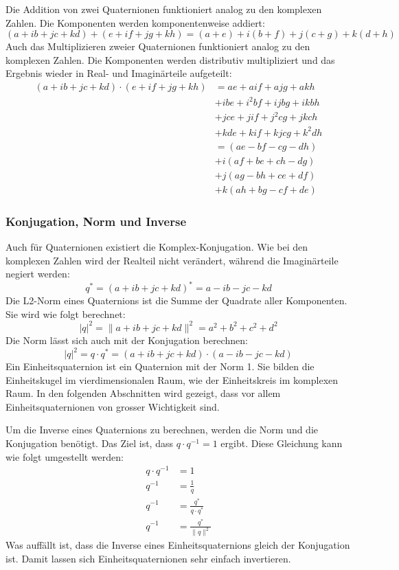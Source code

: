 Die Addition von zwei Quaternionen funktioniert analog zu den 
komplexen Zahlen. Die Komponenten werden komponentenweise addiert:
\begin{equation*}
    (a + ib + jc + kd) + (e + if + jg + kh) 
    = (a+e) + i(b+f) + j(c+g) + k(d+h)
\end{equation*}
Auch das Multiplizieren zweier Quaternionen funktioniert analog zu 
den komplexen Zahlen. Die Komponenten werden distributiv 
multipliziert und das Ergebnis wieder in Real- und Imaginärteile 
aufgeteilt:
\begin{align*}
    (a + ib + jc + kd) \cdot (e + if + jg + kh) 
    &= ae + aif + ajg + akh \\
    &+ ibe + i^2bf + ijbg + ikbh \\
    &+ jce + jif + j^2cg + jkch \\
    &+ kde + kif + kjcg + k^2dh \\
    &= (ae - bf - cg - dh) \\
    &+ i(af + be + ch - dg) \\
    &+ j(ag - bh + ce + df) \\
    &+ k(ah + bg - cf + de)
\end{align*}

\subsubsection{Konjugation, Norm und Inverse}

Auch für Quaternionen existiert die Komplex-Konjugation. Wie bei 
den komplexen Zahlen wird der Realteil nicht verändert, während die 
Imaginärteile negiert werden:
\begin{equation*}
    q^* = (a + ib + jc + kd)^* = a - ib - jc - kd
\end{equation*}
Die L2-Norm eines Quaternions ist die Summe der Quadrate aller 
Komponenten. Sie wird wie folgt berechnet:
\begin{equation*}
    |q|^2 = \|a + ib + jc + kd\|^2 = a^2 + b^2 + c^2 + d^2
\end{equation*}
Die Norm lässt sich auch mit der Konjugation berechnen:
\begin{equation*}
    |q|^2 = q \cdot q^* 
    = (a + ib + jc + kd) \cdot (a - ib - jc - kd)
\end{equation*}
Ein Einheitsquaternion ist ein Quaternion mit der Norm 1. Sie 
bilden die Einheitskugel im vierdimensionalen Raum, wie der 
Einheitskreis im komplexen Raum. In den folgenden Abschnitten wird 
gezeigt, dass vor allem Einheitsquaternionen von grosser 
Wichtigkeit sind.

Um die Inverse eines Quaternions zu berechnen, werden die Norm und 
die Konjugation benötigt. Das Ziel ist, dass $q \cdot q^{-1} = 1$ 
ergibt. Diese Gleichung kann wie folgt umgestellt werden:
\begin{align*}
    q \cdot q^{-1} &= 1 \\
    q^{-1} &= \frac{1}{q} \\
    q^{-1} &= \frac{q^*}{q \cdot q^*} \\
    q^{-1} &= \frac{q^*}{\|q\|^2}
\end{align*}
Was auffällt ist, dass die Inverse eines Einheitsquaternions gleich 
der Konjugation ist. Damit lassen sich Einheitsquaternionen sehr 
einfach invertieren.
